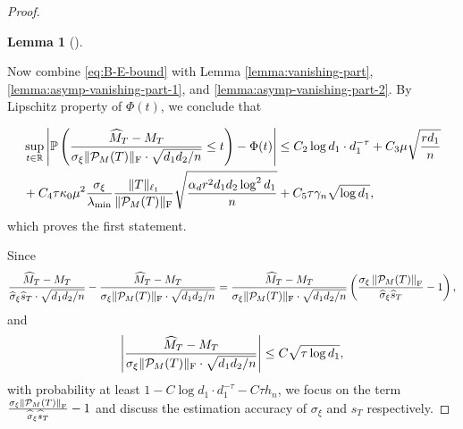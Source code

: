 \documentclass[12pt]{article}
\newcommand{\tF}{{\rm F}}
\newcommand{\abs}[1]{\left\lvert#1\right\rvert}
\newcommand{\norm}[1]{\left\lVert#1\right\rVert}
\newcommand{\cH}{\mathcal{H}}
\newcommand{\cP}{\mathcal{P}}
\newtheorem{Lemma}{Lemma}
\theoremstyle{plain}
\begin{document}
\begin{proof}
\begin{Lemma}[\cite{xia2021statistical}]
\end{Lemma}

Now combine \eqref{eq:B-E-bound} with Lemma \ref{lemma:vanishing-part}, \ref{lemma:asymp-vanishing-part-1}, and \ref{lemma:asymp-vanishing-part-2}. By Lipschitz property of $\Phi (t)$, we conclude that

    \begin{equation*}
    \begin{aligned}
        &\sup _{t \in \mathbb{R}}\left|\mathbb{P}\left(\frac{\widehat{M}_T-M_T}{\sigma_{\xi}\|\cP_M(T) \|_\tF \cdot \sqrt{d_1 d_2 / n}} \leq t\right)-\Phi(t)\right| 
        \le C_2  \log d_1 \cdot d_1^{-\tau}+ C_3\mu \sqrt{\frac{r d_1}{n}} \\
        & + C_4\tau\kappa_0 \mu^2 \frac{\sigma_{\xi}}{ \lambda_{\min} }  \frac{\|T\|_{\ell_1}}{\| \cP_M(T)\|_\tF}\sqrt{\frac{\alpha_d r^2 d_1 d_2 \log ^2 d_1}{n}}+ C_5\tau\gamma_{n} \sqrt{\log d_1},
    \end{aligned}
    \end{equation*}
which proves the first statement.


Since 
\begin{equation}\label{eq:decomp-var-est}
    \frac{\widehat{M}_T-M_T}{\widehat{\sigma}_{\xi}  \widehat{s}_T \cdot \sqrt{d_1 d_2 / n}} - \frac{\widehat{M}_T-M_T}{\sigma_{\xi}\|\cP_M(T) \|_\tF \cdot \sqrt{d_1 d_2 / n}} = \frac{\widehat{M}_T-M_T}{\sigma_{\xi}\|\cP_M(T) \|_\tF \cdot \sqrt{d_1 d_2 / n}}\left( \frac{\sigma_\xi \norm{\cP_M(T)}_\tF }{\widehat{\sigma}_{\xi}  \widehat{s}_T} -1\right), 
\end{equation}
and 
    \begin{equation*}
    \begin{aligned}
\abs{\frac{\widehat{M}_T-M_T}{\sigma_{\xi}\|\cP_M(T) \|_\tF \cdot \sqrt{d_1 d_2 / n}}}\le C \sqrt{\tau \log d_1},
    \end{aligned}
    \end{equation*}
with probability at least $1-C \log d_1 \cdot d_1^{-\tau}-C\tau h_n $, we focus on the term $\frac{\sigma_\xi \norm{\cP_M(T)}_\tF }{\widehat{\sigma}_{\xi}  \widehat{s}_T} -1$ and discuss the estimation accuracy of $\sigma_\xi$ and $s_{T}$ respectively.


\end{proof}
\end{document}
